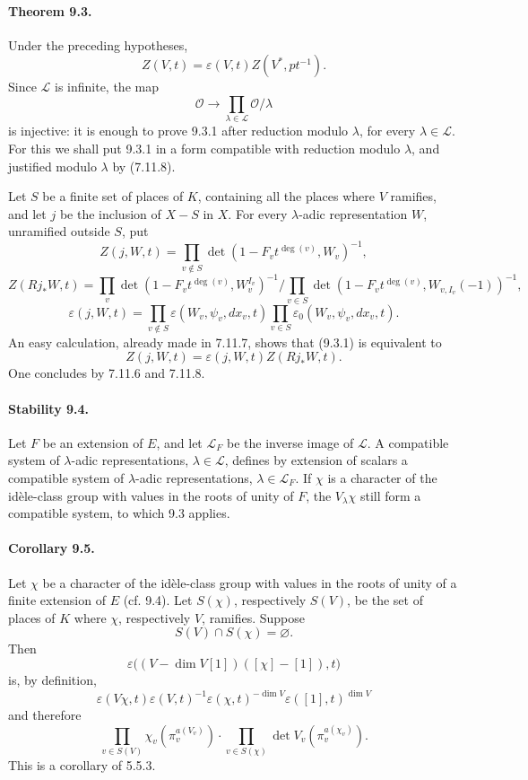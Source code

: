 \documentclass[10pt]{article}
\providecommand{\LLL}{\mathcal L}
\begin{document}
\paragraph{Theorem 9.3.} Under the preceding hypotheses,
\[
\tag{9.3.1}
Z(V,t)=\varepsilon(V,t)Z(V^*,pt^{-1}).
\]
Since $\LLL$ is infinite, the map
\[
\mathcal O\longrightarrow\prod_{\lambda\in\LLL}\mathcal O/\lambda
\]
is injective: it is enough to prove 9.3.1 after reduction modulo $\lambda$, for every $\lambda\in\LLL$. For this we shall put 9.3.1 in a form compatible with reduction modulo $\lambda$, and justified modulo $\lambda$ by (7.11.8).

Let $S$ be a finite set of places of $K$, containing all the places where $V$ ramifies, and let $j$ be the inclusion of $X-S$ in $X$. For every $\lambda$-adic representation $W$, unramified outside $S$, put
\[
Z(j,W,t)=\prod_{v\notin S}\det(1-F_vt^{\deg(v)},W_v)^{-1},
\]
\[
Z(Rj_*W,t)=
\prod_v\det(1-F_vt^{\deg(v)},W_v^{I_v})^{-1}
\Big/
\prod_{v\in S}\det(1-F_vt^{\deg(v)},W_{v,I_v}(-1))^{-1},
\]
\[
\varepsilon(j,W,t)=
\prod_{v\notin S}\varepsilon(W_v,\psi_v,dx_v,t)
\prod_{v\in S}\varepsilon_0(W_v,
\psi_v,dx_v,t).
\]
An easy calculation, already made in 7.11.7, shows that (9.3.1) is equivalent to
\[
\tag{9.3.2}
Z(j,W,t)=\varepsilon(j,W,t)Z(Rj_*W,t).
\]
One concludes by 7.11.6 and 7.11.8.

\paragraph{Stability 9.4.} Let $F$ be an extension of $E$, and let $\LLL_F$ be the inverse image of $\LLL$. A compatible system of $\lambda$-adic representations, $\lambda\in\LLL$, defines by extension of scalars a compatible system of $\lambda$-adic representations, $\lambda\in\LLL_F$. If $\chi$ is a character of the idèle-class group with values in the roots of unity of $F$, the $V_\lambda\chi$ still form a compatible system, to which 9.3 applies.

\paragraph{Corollary 9.5.} Let $\chi$ be a character of the idèle-class group with values in the roots of unity of a finite extension of $E$ (cf. 9.4). Let $S(\chi)$, respectively $S(V)$, be the set of places of $K$ where $\chi$, respectively $V$, ramifies. Suppose
\[
S(V)\cap S(\chi)=\varnothing.
\]
Then
\[
\varepsilon\bigl((V-\dim V[1])([\chi]-[1]),t\bigr)
\]
is, by definition,
\[
\varepsilon(V\chi,t)\varepsilon(V,t)^{-1}
\varepsilon(\chi,t)^{-\dim V}\varepsilon([1],t)^{\dim V}
\]
and therefore
\[
\prod_{v\in S(V)}\chi_v(\pi_v^{a(V_v)})
\cdot
\prod_{v\in S(\chi)}\det V_v(\pi_v^{a(\chi_v)}).
\]
This is a corollary of 5.5.3.
\end{document}
